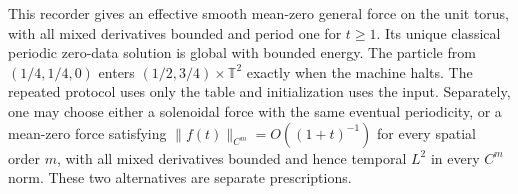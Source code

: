 \begin{theorem}
\label{thm:sa-marked-five-stage}
This recorder gives an effective smooth mean-zero general force on the
unit torus, with all mixed derivatives bounded and period one for $t\ge1$.
Its unique classical periodic zero-data solution is global with bounded
energy.  The particle from $(1/4,1/4,0)$ enters
$(1/2,3/4)\times\mathbb T^2$ exactly when the machine halts.
The repeated protocol uses only the table and initialization uses the
input.  Separately, one may choose either a solenoidal force with the
same eventual periodicity, or a mean-zero force satisfying
$\|f(t)\|_{C^m}=O((1+t)^{-1})$ for every spatial order $m$, with all
mixed derivatives bounded and hence temporal $L^2$ in every $C^m$ norm.
These two alternatives are separate prescriptions.
\end{theorem}
